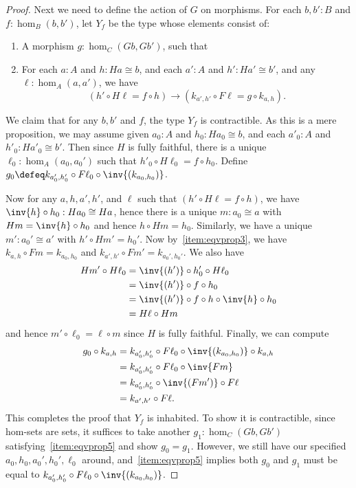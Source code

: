 \begin{proof}
  Next we need to define the action of $G$ on morphisms.
  For each $b,b':B$ and $f:\hom_B(b,b')$, let $Y_f$ be the type whose elements consist of:
  \begin{enumerate}[resume]
  \item A morphism $g:\hom_C(Gb,Gb')$, such that
  \item For each $a:A$ and $h:Ha\cong b$, and each $a':A$ and $h':Ha'\cong b'$, and any $\ell:\hom_A(a,a')$, we have\label{item:eqvprop5}
    \[ (h' \circ H\ell = f \circ h)
    \to
    (k_{a',h'} \circ F\ell = g\circ k_{a,h}). \]
  \end{enumerate}
  We claim that for any $b,b'$ and $f$, the type $Y_f$ is contractible.
  As this is a mere proposition, we may assume given $a_0:A$ and $h_0:Ha_0\cong b$, and each $a'_0:A$ and $h'_0:Ha'_0\cong b'$.
  Then since $H$ is fully faithful, there is a unique $\ell_0:\hom_A(a_0,a_0')$ such that $h'_0 \circ H\ell_0 = f \circ h_0$.
  Define $g_0 \defeq k_{a_0',h_0'} \circ F \ell_0 \circ \inv{(k_{a_0,h_0})}$.

  Now for any $a,h,a',h'$, and $\ell$ such that $(h' \circ H\ell = f \circ h)$, we have $\inv{h}\circ h_0:Ha_0\cong Ha$, hence there is a unique $m:a_0\cong a$ with $Hm = \inv{h}\circ h_0$ and hence $h\circ Hm = h_0$.
  Similarly, we have a unique $m':a_0'\cong a'$ with $h'\circ Hm' = h_0'$.
  Now by~\ref{item:eqvprop3}, we have $k_{a,h}\circ Fm = k_{a_0,h_0}$ and $k_{a',h'}\circ Fm' = k_{a_0',h_0'}$.
  We also have
  \begin{align*}
    Hm' \circ H\ell_0
    &= \inv{(h')} \circ h_0' \circ H\ell_0\\
    &= \inv{(h')} \circ f \circ h_0\\
    &= \inv{(h')} \circ f \circ h \circ \inv{h} \circ h_0\\
    &= H\ell \circ Hm
  \end{align*}
  and hence $m'\circ \ell_0 = \ell\circ m$ since $H$ is fully faithful.
  Finally, we can compute
  \begin{align*}
    g_0 \circ k_{a,h}
    &= k_{a_0',h_0'} \circ F \ell_0 \circ \inv{(k_{a_0,h_0})} \circ k_{a,h}\\
    &= k_{a_0',h_0'} \circ F \ell_0 \circ \inv{Fm}\\
    &= k_{a_0',h_0'} \circ \inv{(Fm')} \circ F\ell\\
    &= k_{a',h'}\circ F\ell.
  \end{align*}
  This completes the proof that $Y_f$ is inhabited.
  To show it is contractible, since hom-sets are sets, it suffices to take another $g_1:\hom_C(Gb,Gb')$ satisfying~\ref{item:eqvprop5} and show $g_0=g_1$.
  However, we still have our specified $a_0,h_0,a_0',h_0',\ell_0$ around, and~\ref{item:eqvprop5} implies both $g_0$ and $g_1$ must be equal to $k_{a_0',h_0'} \circ F \ell_0 \circ \inv{(k_{a_0,h_0})}$.


\end{proof}
